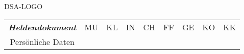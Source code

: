 \renewcommand{\arraystretch}{1.4} %
%
DSA-LOGO

\begin{tabular}{cllllllll}
	\textbf{\textit{\Large Heldendokument}} & MU & KL & IN & CH & FF & GE & KO & KK\\
	Persönliche Daten & & & & & & & &\\
\end{tabular}
